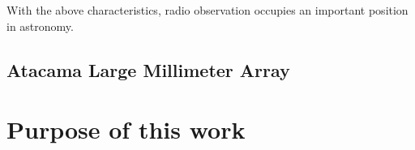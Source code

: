 With the above characteristics, radio observation occupies an important position in astronomy.

\subsection{Atacama Large Millimeter Array}

\section{Purpose of this work}